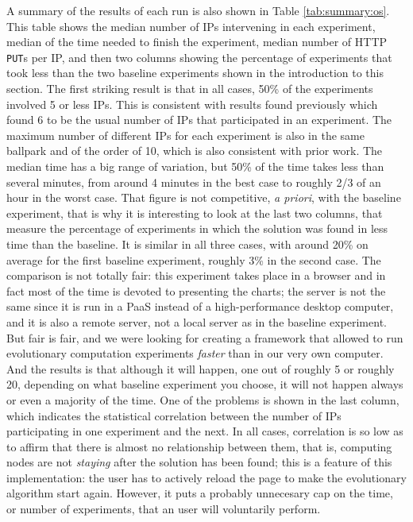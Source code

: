 \documentclass[journal,onecolumn]{IEEEtran}
\begin{document}
A summary of the results of each run is also shown in Table
\ref{tab:summary:os}. This table shows the median number of IPs
intervening in each experiment,  median of the time needed
to finish the experiment, median number of HTTP {\tt PUT}s per IP, and
then two columns showing the percentage of experiments that took less
than the two baseline experiments shown in the introduction to this
section. The first striking result is that in all cases, 50\% of the
experiments involved 5 or less IPs. This is consistent with results
found previously \cite{DBLP:conf/gecco/GuervosG15} which found 6 to be
the usual number of IPs that participated in an experiment. The
maximum number of different IPs for each experiment is also in the
same ballpark and of the order of 10, which is also consistent with
prior work. The median time has a big range of variation, but 50\% of
the time takes less than several minutes, from around 4 minutes in the
best case to roughly 2/3 of an hour in the worst case. That figure is
not competitive, {\em a priori}, with the baseline experiment, that is
why it is interesting to look at the last two columns, that measure
the percentage of experiments in which the solution was found in less
time than the baseline. It is similar in all three cases, with around
20\% on average for the first baseline experiment, roughly 3\% in the
second case. The comparison is not totally fair: this experiment takes
place in a browser and in fact most of the time is devoted to
presenting the charts; the server is not the same since it is run in a
PaaS instead of a high-performance desktop computer, and it is also a
remote server, not a local server as in the baseline experiment. But
fair is fair, and we were looking for creating a framework that
allowed to run evolutionary computation experiments {\em faster} than
in our very own computer. And the results is that although it will
happen, one out of roughly 5 or roughly 20, depending on what baseline
experiment you choose, it will not happen always or even a majority of
the time. One of the problems is shown in the last column, which
indicates the statistical correlation between the number of IPs
participating in one experiment and the next. In all cases,
correlation is so low as to affirm that there is almost no
relationship between them, that is, computing nodes are not {\em
  staying} after the solution has been found; this is a feature of
this implementation: the user has to actively reload the page to make
the evolutionary algorithm start again. However, it puts a probably
unnecesary cap on the time, or number of experiments, that an user
will voluntarily perform.
\end{document}
